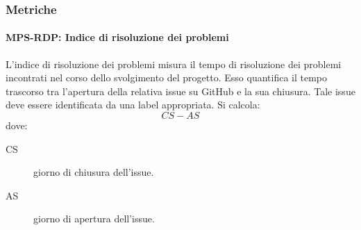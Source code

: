 \documentclass[../../norme-di-progetto.tex]{subfiles}
\begin{document}
\subsubsection{Metriche}%
\label{subs:risoluzione_dei_problemi/metriche}

\paragraph{MPS-RDP: Indice di risoluzione dei problemi}%
\label{par:MPS-RDP_indice_di_risoluzione_dei_problemi}

L'indice di risoluzione dei problemi misura il tempo di risoluzione dei problemi incontrati nel corso dello svolgimento del progetto.
Esso quantifica il tempo trascorso tra l'apertura della relativa issue su GitHub e la sua chiusura. Tale issue deve essere identificata da una label appropriata. Si calcola:
\[
  CS-AS
\]
dove:
\begin{description}
  \item [CS] giorno di chiusura dell'issue.
  \item [AS] giorno di apertura dell'issue.
\end{description}
\end{document}
